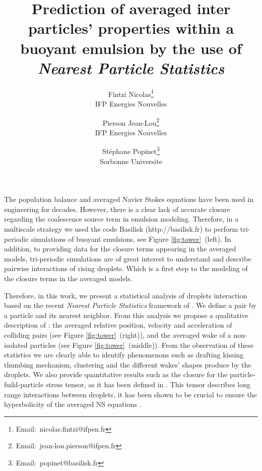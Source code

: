 \documentclass{icnmmf5}
\title{Prediction of averaged inter particles' properties within a buoyant emulsion by the use of \textit{Nearest Particle Statistics}}
\author{Fintzi Nicolas\thanks{Email:~nicolas.fintzi@ifpen.fr}\\IFP Energies Nouvelles\and
Pierson Jean-Lou\thanks{Email:~jean-lou.pierson@ifpen.fr}\\IFP Energies Nouvelles
\and
St\'ephane Popinet\thanks{Email:~popinet@basilisk.fr}\\Sorbonne Universite}
\date{}
\begin{document}
\maketitle

The population balance and averaged Navier Stokes equations have been used in engineering for decades. 
However, there is a clear lack of accurate closure regarding the coalescence source term in emulsion modeling.  
Therefore, in a multiscale strategy we used the code Basilisk ({http://basilisk.fr}) to perform tri-periodic simulations of buoyant emulsions, see Figure \ref{fig:tower}~(left). 
In addition, to providing data for the closure terms appearing in the averaged models, tri-periodic simulations are of great interest to understand and describe pairwise interactions of rising droplets. 
Which is a first step to the modeling of the closure terms in the averaged models. 

Therefore, in this work, we present a statistical analysis of droplets interaction based on the recent \textit{Nearest Particle Statistics} framework of \cite{zhang2021ensemble}.
We define a pair by a particle and its nearest neighbor. 
From this analysis we propose a qualitative description of : 
the averaged relative position, velocity and acceleration of colliding pairs (see Figure \ref{fig:tower}~(right)), and the averaged wake of a non-isolated particles (see Figure \ref{fig:tower}~(middle)).
From the observation of these statistics we are clearly able to identify phenomenons such as  drafting kissing thumbing mechanism, clustering and the different wakes' shapes produce by the droplets.   
We also provide quantitative results such as the closure for the particle-fuild-particle stress tensor, as it has been defined in \cite{zhang2021ensemble}. 
This tensor describes long range interactions between droplets, it has been shown to be crucial to ensure the hyperbolicity of the averaged NS equations \cite{fox2020hyperbolic}. 
\end{document}
